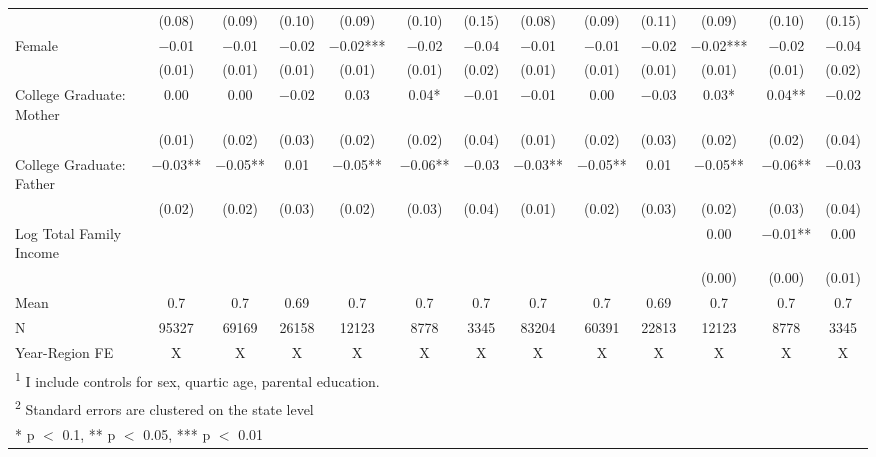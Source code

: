 \begin{landscape}
\begin{table}[!h]
{\begin{tabular}[t]{lcccccccccccc}
 & (\num{0.08}) & (\num{0.09}) & (\num{0.10}) & (\num{0.09}) & (\num{0.10}) & (\num{0.15}) & (\num{0.08}) & (\num{0.09}) & (\num{0.11}) & (\num{0.09}) & (\num{0.10}) & (\num{0.15})\\
Female & \num{-0.01} & \num{-0.01} & \num{-0.02} & \num{-0.02}*** & \num{-0.02} & \num{-0.04} & \num{-0.01} & \num{-0.01} & \num{-0.02} & \num{-0.02}*** & \num{-0.02} & \num{-0.04}\\
 & (\num{0.01}) & (\num{0.01}) & (\num{0.01}) & (\num{0.01}) & (\num{0.01}) & (\num{0.02}) & (\num{0.01}) & (\num{0.01}) & (\num{0.01}) & (\num{0.01}) & (\num{0.01}) & (\num{0.02})\\
College Graduate: Mother & \num{0.00} & \num{0.00} & \num{-0.02} & \num{0.03} & \num{0.04}* & \num{-0.01} & \num{-0.01} & \num{0.00} & \num{-0.03} & \num{0.03}* & \num{0.04}** & \num{-0.02}\\
 & (\num{0.01}) & (\num{0.02}) & (\num{0.03}) & (\num{0.02}) & (\num{0.02}) & (\num{0.04}) & (\num{0.01}) & (\num{0.02}) & (\num{0.03}) & (\num{0.02}) & (\num{0.02}) & (\num{0.04})\\
College Graduate: Father & \num{-0.03}** & \num{-0.05}** & \num{0.01} & \num{-0.05}** & \num{-0.06}** & \num{-0.03} & \num{-0.03}** & \num{-0.05}** & \num{0.01} & \num{-0.05}** & \num{-0.06}** & \num{-0.03}\\
 & (\num{0.02}) & (\num{0.02}) & (\num{0.03}) & (\num{0.02}) & (\num{0.03}) & (\num{0.04}) & (\num{0.01}) & (\num{0.02}) & (\num{0.03}) & (\num{0.02}) & (\num{0.03}) & (\num{0.04})\\
Log Total Family Income &  &  &  &  &  &  &  &  &  & \num{0.00} & \num{-0.01}** & \num{0.00}\\
 &  &  &  &  &  &  &  &  &  & (\num{0.00}) & (\num{0.00}) & (\num{0.01})\\
\midrule
Mean & \num{0.7} & \num{0.7} & \num{0.69} & \num{0.7} & \num{0.7} & \num{0.7} & \num{0.7} & \num{0.7} & \num{0.69} & \num{0.7} & \num{0.7} & \num{0.7}\\
N & \num{95327} & \num{69169} & \num{26158} & \num{12123} & \num{8778} & \num{3345} & \num{83204} & \num{60391} & \num{22813} & \num{12123} & \num{8778} & \num{3345}\\
Year-Region FE & X & X & X & X & X & X & X & X & X & X & X & X\\
\bottomrule
\multicolumn{13}{l}{\rule{0pt}{1em}\textsuperscript{1} I include controls for sex, quartic age, parental education.}\\
\multicolumn{13}{l}{\rule{0pt}{1em}\textsuperscript{2} Standard errors are clustered on the state level}\\
\multicolumn{13}{l}{\rule{0pt}{1em}* p $<$ 0.1, ** p $<$ 0.05, *** p $<$ 0.01}\\
\end{tabular}}
\end{table}
\end{landscape}
